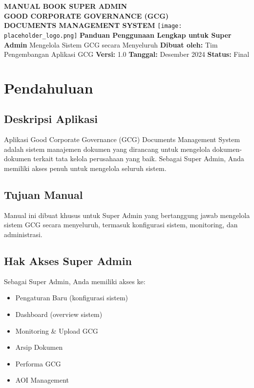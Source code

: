 \documentclass[12pt,a4paper]{article}
\begin{document}
\begin{titlepage}
\centering
\vspace*{2cm}
{\Huge\bfseries\color{darkblue} MANUAL BOOK SUPER ADMIN\\[0.5cm] GOOD CORPORATE GOVERNANCE (GCG)\\[0.5cm] DOCUMENTS MANAGEMENT SYSTEM}
\vspace{2cm}
\texttt{[image: placeholder\_logo.png]}
\vspace{2cm}
{\Large\bfseries Panduan Penggunaan Lengkap untuk Super Admin}
\vspace{1cm}
{\large Mengelola Sistem GCG secara Menyeluruh}
\vfill
{\large \textbf{Dibuat oleh:} Tim Pengembangan Aplikasi GCG}
\vspace{0.5cm}
{\large \textbf{Versi:} 1.0}
\vspace{0.5cm}
{\large \textbf{Tanggal:} Desember 2024}
\vspace{0.5cm}
{\large \textbf{Status:} Final}
\vspace{1cm}
\end{titlepage}

\tableofcontents
\newpage

\section{Pendahuluan}

\subsection{Deskripsi Aplikasi}
Aplikasi Good Corporate Governance (GCG) Documents Management System adalah sistem manajemen dokumen yang dirancang untuk mengelola dokumen-dokumen terkait tata kelola perusahaan yang baik. Sebagai Super Admin, Anda memiliki akses penuh untuk mengelola seluruh sistem.

\subsection{Tujuan Manual}
Manual ini dibuat khusus untuk Super Admin yang bertanggung jawab mengelola sistem GCG secara menyeluruh, termasuk konfigurasi sistem, monitoring, dan administrasi.

\subsection{Hak Akses Super Admin}
Sebagai Super Admin, Anda memiliki akses ke:
\begin{itemize}
\item Pengaturan Baru (konfigurasi sistem)
\item Dashboard (overview sistem)
\item Monitoring \& Upload GCG
\item Arsip Dokumen
\item Performa GCG
\item AOI Management
\end{itemize}
\end{document}
